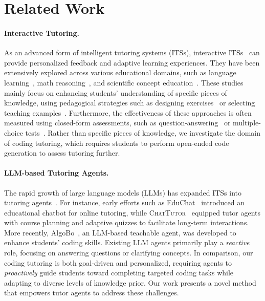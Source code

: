 \section{Related Work}

\paragraph{Interactive Tutoring.}
As an advanced form of intelligent tutoring systems (ITSs), interactive ITSs~\citep{graesser2001intelligent,rus2013recent} can provide personalized feedback and adaptive learning experiences. 
They have been extensively explored across various educational domains, such as language learning~\citep{swartz2012intelligent,stasaski-etal-2020-cima,caines-etal-2020-teacher, kwon-etal-2024-biped}, math reasoning~\citep{demszky-hill-2023-ncte,macina-etal-2023-mathdial,wang-etal-2024-bridging}, and scientific concept education~\citep{yuan-etal-2024-boosting,yang2024leveraging}. 
These studies mainly focus on enhancing students' understanding of specific pieces of knowledge, using pedagogical strategies such as designing exercises~\citep{deng2023towards,wang-etal-2022-towards,lu2023readingquizmaker} or selecting teaching examples~\citep{ross-andreas-2024-toward}.
Furthermore, the effectiveness of these approaches is often measured using closed-form assessments, such as question-answering~\cite{yuan-etal-2024-boosting} or multiple-choice tests~\cite{macina-etal-2023-mathdial}. 
Rather than specific pieces of knowledge, we investigate the domain of coding tutoring, which requires students to perform open-ended code generation to assess tutoring further.



\paragraph{LLM-based Tutoring Agents.}
The rapid growth of large language models (LLMs) has expanded ITSs into tutoring agents~\citep{yu2024mooc}. 
For instance, early efforts such as EduChat~\citep{dan2023educhat} introduced an educational chatbot for online tutoring, while \textsc{ChatTutor}~\citep{chen2024empowering} equipped tutor agents with course planning and adaptive quizzes to facilitate long-term interactions. 
More recently, AlgoBo~\citep{jin2024teach}, an LLM-based teachable agent, was developed to enhance students' coding skills. 
Existing LLM agents primarily play a \textit{reactive} role, focusing on answering questions or clarifying concepts. 
In comparison, our coding tutoring is both goal-driven and personalized, requiring agents to \textit{proactively} guide students toward completing targeted coding tasks while adapting to diverse levels of knowledge prior. 
Our work presents a novel method that empowers tutor agents to address these challenges.


